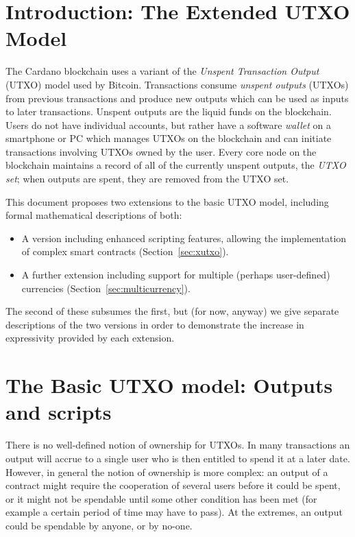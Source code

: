 \documentclass[a4paper]{article}
\theoremstyle{definition}  %
\begin{document}
\maketitle

\section{Introduction: The Extended UTXO Model}
\label{sec:intro}
The Cardano blockchain uses a variant of the \textit{Unspent
  Transaction Output} (UTXO) model used by Bitcoin.  Transactions
consume \textit{unspent outputs} (UTXOs) from previous transactions
and produce new outputs which can be used as inputs to later
transactions.  Unspent outputs are the liquid funds on the
blockchain. Users do not have individual accounts, but rather have a
software \textit{wallet} on a smartphone or PC which manages UTXOs on
the blockchain and can initiate transactions involving UTXOs owned by
the user.  Every core node on the blockchain maintains a record of all
of the currently unspent outputs, the \textit{UTXO set}; when outputs
are spent, they are removed from the UTXO set.

This document proposes two extensions to the basic UTXO model, including
formal mathematical descriptions of both:
\begin{itemize}
\item A version including enhanced scripting features, allowing the
  implementation of complex smart contracts (Section~\ref{sec:xutxo}).
\item A further extension including support for multiple (perhaps user-defined)
  currencies (Section~\ref{sec:multicurrency}).
\end{itemize}

\noindent The second of these subsumes the first, but (for now, anyway) we give
separate descriptions of the two versions in order to demonstrate the
increase in expressivity provided by each extension.

\section{The Basic UTXO model: Outputs and scripts}
\label{sec:utxo-intro}

There is no well-defined notion of ownership for UTXOs.  In many
transactions an output will accrue to a single user who is then
entitled to spend it at a later date.  However, in general the notion
of ownership is more complex: an output of a contract might require
the cooperation of several users before it could be spent, or it might
not be spendable until some other condition has been met (for example
a certain period of time may have to pass).  At the extremes, an
output could be spendable by anyone, or by no-one.
\end{document}
